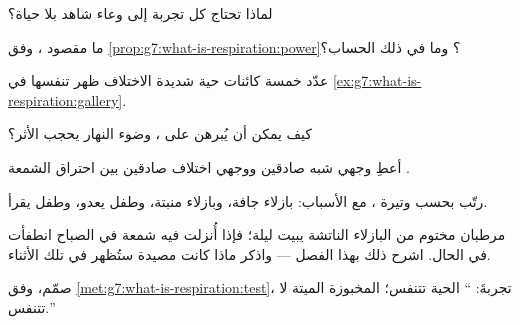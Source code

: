 \begin{exercise}[$\star$]\label{exo:g7:what-is-respiration:3}
لماذا تحتاج كل تجربة  إلى وعاء شاهد بلا حياة؟
\end{exercise}

\begin{exercise}[$\star$]\label{exo:g7:what-is-respiration:4}
ما مقصود ، وفق \cref{prop:g7:what-is-respiration:power}؟ وما
 في ذلك الحساب؟
\end{exercise}

\begin{exercise}[$\star$]\label{exo:g7:what-is-respiration:5}
عدّد خمسة كائنات حية شديدة الاختلاف ظهر تنفسها في
\cref{ex:g7:what-is-respiration:gallery}.
\end{exercise}

\begin{exercise}[$\star$]\label{exo:g7:what-is-respiration:6}
كيف يمكن أن يُبرهن على  ، وضوء النهار يحجب الأثر؟
\end{exercise}

\begin{exercise}[$\star\star$]\label{exo:g7:what-is-respiration:7}
أعطِ وجهي شبه صادقين ووجهي اختلاف صادقين بين احتراق الشمعة 
.
\end{exercise}

\begin{exercise}[$\star\star$]\label{exo:g7:what-is-respiration:8}
رتّب بحسب وتيرة ، مع الأسباب: بازلاء جافة، وبازلاء منبتة،
وطفل يعدو، وطفل يقرأ.
\end{exercise}

\begin{exercise}[$\star\star$]\label{exo:g7:what-is-respiration:9}
مرطبان مختوم من البازلاء الناتشة يبيت ليلة؛ فإذا أُنزلت فيه شمعة
في الصباح انطفأت في الحال. اشرح ذلك بهذا الفصل --- واذكر ماذا كانت
مصيدة  ستُظهر في تلك الأثناء.
\end{exercise}

\begin{exercise}[$\star\star$]\label{exo:g7:what-is-respiration:10}
صمّم، وفق \cref{met:g7:what-is-respiration:test}، تجربةَ: ``
الحية تتنفس؛  المخبوزة الميتة لا تتنفس.''
\end{exercise}

